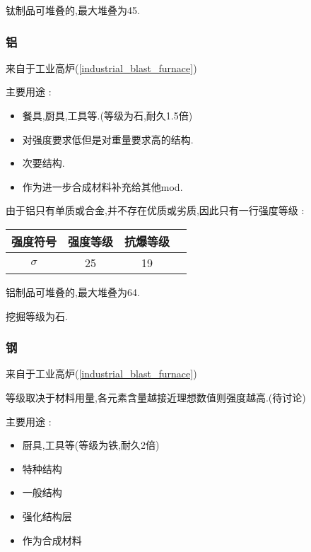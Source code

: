 {{{          钛制品可堆叠的,最大堆叠为45.
      }

      \subsubsection{铝}{
          来自于工业高炉({\ref{industrial_blast_furnace}})

          主要用途 :
          \begin{itemize}[itemsep=1pt]
              \item 餐具,厨具,工具等.(等级为石,耐久1.5倍)
              \item 对强度要求低但是对重量要求高的结构.
              \item 次要结构.
              \item 作为进一步合成材料补充给其他mod.
          \end{itemize}

          由于铝只有单质或合金,并不存在优质或劣质,因此只有一行强度等级 :
          \begin{center}
              \begin{tabular}{|c|c|c|c|}
                  \hline
                  强度符号 & 强度等级 & 抗爆等级 \\
                  \hline
                  $\sigma$ & 25      & 19   \\
                  \hline
              \end{tabular}
          \end{center}

          铝制品可堆叠的,最大堆叠为64.

          挖掘等级为石.
      }

      \subsubsection{钢}{
          来自于工业高炉({\ref{industrial_blast_furnace}})

          等级取决于材料用量,各元素含量越接近理想数值则强度越高.(待讨论)

          主要用途 :
          \begin{itemize}[itemsep=1pt]
              \item 厨具,工具等(等级为铁,耐久2倍)
              \item 特种结构
              \item 一般结构
              \item 强化结构层
              \item 作为合成材料
          \end{itemize}

}}}
